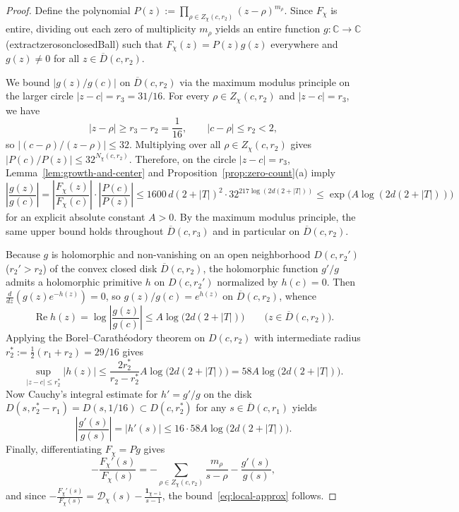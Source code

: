 \documentclass[11pt,reqno]{amsart}
\numberwithin{equation}{section}
\theoremstyle{definition}
\newcommand{\C}{\mathbb{C}}
\newcommand{\1}{\mathbf{1}}
\newcommand{\D}{\mathcal{D}}
\renewcommand{\Re}{\operatorname{Re}}
\newcommand{\lean}[1]{{\footnotesize\ttfamily\renewcommand{\_}{\textunderscore\allowbreak}#1}}
\begin{document}
\begin{proof}
Define the polynomial $P(z) := \prod_{\rho \in Z_\chi(c, r_2)} (z - \rho)^{m_\rho}$. Since $F_\chi$ is entire, dividing out each zero of multiplicity $m_\rho$ yields an entire function $g : \C \to \C$ (\lean{extract\_zeros\_on\_closedBall}) such that $F_\chi(z) = P(z) g(z)$ everywhere and $g(z) \neq 0$ for all $z \in \overline{D}(c, r_2)$.

We bound $|g(z)/g(c)|$ on $\overline{D}(c, r_2)$ via the maximum modulus principle on the larger circle $|z - c| = r_3 = 31/16$. For every $\rho \in Z_\chi(c, r_2)$ and $|z - c| = r_3$, we have
\[
  |z - \rho| \ge r_3 - r_2 = \frac{1}{16}, \qquad |c - \rho| \le r_2 < 2,
\]
so $|(c - \rho)/(z - \rho)| \le 32$. Multiplying over all $\rho \in Z_\chi(c, r_2)$ gives $|P(c)/P(z)| \le 32^{N_\chi(c, r_2)}$. Therefore, on the circle $|z - c| = r_3$, Lemma~\ref{lem:growth-and-center} and Proposition~\ref{prop:zero-count}(a) imply
\[
  \left|\frac{g(z)}{g(c)}\right| = \left|\frac{F_\chi(z)}{F_\chi(c)}\right|\cdot\left|\frac{P(c)}{P(z)}\right|
  \le 1600\, d(2+|T|)^2 \cdot 32^{217 \log(2d(2+|T|))}
  \le \exp\bigl(A \log(2d(2+|T|))\bigr)
\]
for an explicit absolute constant $A > 0$. By the maximum modulus principle, the same upper bound holds throughout $\overline{D}(c, r_3)$ and in particular on $\overline{D}(c, r_2)$.

Because $g$ is holomorphic and non-vanishing on an open neighborhood $D(c, r_2')$ ($r_2' > r_2$) of the convex closed disk $\overline{D}(c, r_2)$, the holomorphic function $g'/g$ admits a holomorphic primitive $h$ on $D(c, r_2')$ normalized by $h(c) = 0$. Then $\frac{d}{dz}(g(z) e^{-h(z)}) = 0$, so $g(z)/g(c) = e^{h(z)}$ on $\overline{D}(c, r_2)$, whence
\[
  \Re h(z) = \log\left|\frac{g(z)}{g(c)}\right| \le A \log\bigl(2 d (2 + |T|)\bigr) \qquad \bigl(z \in \overline{D}(c, r_2)\bigr).
\]
Applying the Borel--Carath\'eodory theorem on $D(c, r_2)$ with intermediate radius $r_2^* := \frac{1}{2}(r_1 + r_2) = 29/16$ gives
\[
  \sup_{|z - c| \le r_2^*} |h(z)| \le \frac{2 r_2^*}{r_2 - r_2^*} A \log\bigl(2 d (2 + |T|)\bigr) = 58 A \log\bigl(2 d (2 + |T|)\bigr).
\]
Now Cauchy's integral estimate for $h' = g'/g$ on the disk $D(s, r_2^* - r_1) = D(s, 1/16) \subset D(c, r_2^*)$ for any $s \in \overline{D}(c, r_1)$ yields
\[
  \left|\frac{g'(s)}{g(s)}\right| = |h'(s)| \le 16 \cdot 58 A \log\bigl(2 d (2 + |T|)\bigr).
\]
Finally, differentiating $F_\chi = P g$ gives
\[
  -\frac{F_\chi'(s)}{F_\chi(s)} = -\sum_{\rho \in Z_\chi(c, r_2)} \frac{m_\rho}{s - \rho} - \frac{g'(s)}{g(s)},
\]
and since $-\frac{F_\chi'(s)}{F_\chi(s)} = \D_\chi(s) - \frac{\1_{\chi=1}}{s-1}$, the bound~\eqref{eq:local-approx} follows.
\end{proof}
\end{document}

